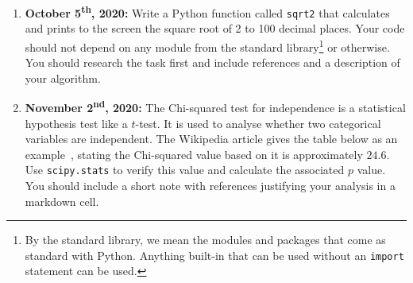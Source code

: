 \documentclass[a4paper, 12pt]{scrartcl}
\begin{document}
    \begin{enumerate}
      \item
        \textbf{October 5\textsuperscript{th}, 2020:}
        Write a Python function called \texttt{sqrt2} that calculates and prints to the screen the square root of 2 to 100 decimal places.
        Your code should not depend on any module from the standard library\footnote{By the standard library, we mean the modules and packages that come as standard with Python. Anything built-in that can be used without an \texttt{import} statement can be used.} or otherwise.
        You should research the task first and include references and a description of your algorithm.
      \item
        \textbf{November 2\textsuperscript{nd}, 2020:}
        The Chi-squared test for independence is a statistical hypothesis test like a $t$-test.
        It is used to analyse whether two categorical variables are independent.
        The Wikipedia article gives the table below as an example~\cite{wikichisquare}, stating the Chi-squared value based on it is approximately $24.6$.
        Use \texttt{scipy.stats} to verify this value and calculate the associated $p$ value.
        You should include a short note with references justifying your analysis in a markdown cell.
         

\end{enumerate}
\end{document}
